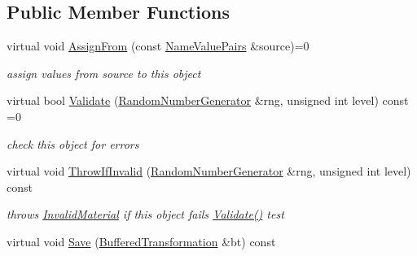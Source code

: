 \subsection*{Public Member Functions}
\begin{DoxyCompactItemize}
\item 
virtual void \hyperlink{class_crypto_material_a20181c1b39a74a9fe91385b025b773c6}{AssignFrom} (const \hyperlink{class_name_value_pairs}{NameValuePairs} \&source)=0
\begin{DoxyCompactList}\small\item\em assign values from source to this object \item\end{DoxyCompactList}\item 
virtual bool \hyperlink{class_crypto_material_aaa7d67d0c12712de0e33713c73f5b718}{Validate} (\hyperlink{class_random_number_generator}{RandomNumberGenerator} \&rng, unsigned int level) const =0
\begin{DoxyCompactList}\small\item\em check this object for errors \item\end{DoxyCompactList}\item 
\hypertarget{class_crypto_material_a6843c1d4563fbb0208deb22624e12cce}{
virtual void \hyperlink{class_crypto_material_a6843c1d4563fbb0208deb22624e12cce}{ThrowIfInvalid} (\hyperlink{class_random_number_generator}{RandomNumberGenerator} \&rng, unsigned int level) const }
\label{class_crypto_material_a6843c1d4563fbb0208deb22624e12cce}

\begin{DoxyCompactList}\small\item\em throws \hyperlink{class_crypto_material_1_1_invalid_material}{InvalidMaterial} if this object fails \hyperlink{class_crypto_material_aaa7d67d0c12712de0e33713c73f5b718}{Validate()} test \item\end{DoxyCompactList}\item 
\hypertarget{class_crypto_material_a690c7ce3e765a502b29b47a08c1a4e7b}{
virtual void \hyperlink{class_crypto_material_a690c7ce3e765a502b29b47a08c1a4e7b}{Save} (\hyperlink{class_buffered_transformation}{BufferedTransformation} \&bt) const }
\label{class_crypto_material_a690c7ce3e765a502b29b47a08c1a4e7b}


\end{DoxyCompactItemize}
